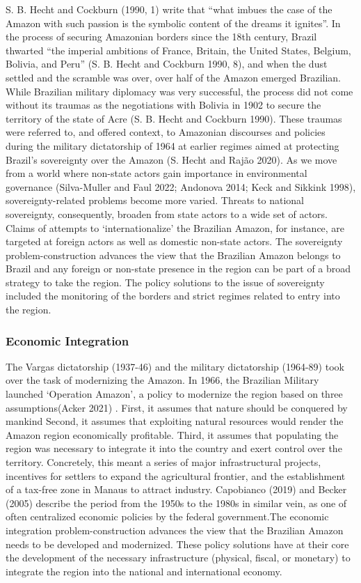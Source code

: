 \documentclass[
  12pt,
]{article}
\begin{document}
S. B. Hecht and Cockburn (1990, 1) write that ``what imbues the case of
the Amazon with such passion is the symbolic content of the dreams it
ignites''. In the process of securing Amazonian borders since the 18th
century, Brazil thwarted ``the imperial ambitions of France, Britain,
the United States, Belgium, Bolivia, and Peru'' (S. B. Hecht and
Cockburn 1990, 8), and when the dust settled and the scramble was over,
over half of the Amazon emerged Brazilian. While Brazilian military
diplomacy was very successful, the process did not come without its
traumas as the negotiations with Bolivia in 1902 to secure the territory
of the state of Acre (S. B. Hecht and Cockburn 1990). These traumas were
referred to, and offered context, to Amazonian discourses and policies
during the military dictatorship of 1964 at earlier regimes aimed at
protecting Brazil's sovereignty over the Amazon (S. Hecht and Rajão
2020). As we move from a world where non-state actors gain importance in
environmental governance (Silva-Muller and Faul 2022; Andonova 2014;
Keck and Sikkink 1998), sovereignty-related problems become more varied.
Threats to national sovereignty, consequently, broaden from state actors
to a wide set of actors. Claims of attempts to `internationalize' the
Brazilian Amazon, for instance, are targeted at foreign actors as well
as domestic non-state actors. The sovereignty problem-construction
advances the view that the Brazilian Amazon belongs to Brazil and any
foreign or non-state presence in the region can be part of a broad
strategy to take the region. The policy solutions to the issue of
sovereignty included the monitoring of the borders and strict regimes
related to entry into the region.

\hypertarget{economic-integration}{%
\subsubsection{Economic Integration}\label{economic-integration}}

The Vargas dictatorship (1937-46) and the military dictatorship
(1964-89) took over the task of modernizing the Amazon. In 1966, the
Brazilian Military launched `Operation Amazon', a policy to modernize
the region based on three assumptions(Acker 2021) . First, it assumes
that nature should be conquered by mankind Second, it assumes that
exploiting natural resources would render the Amazon region economically
profitable. Third, it assumes that populating the region was necessary
to integrate it into the country and exert control over the territory.
Concretely, this meant a series of major infrastructural projects,
incentives for settlers to expand the agricultural frontier, and the
establishment of a tax-free zone in Manaus to attract industry.
Capobianco (2019) and Becker (2005) describe the period from the 1950s
to the 1980s in similar vein, as one of often centralized economic
policies by the federal government.The economic integration
problem-construction advances the view that the Brazilian Amazon needs
to be developed and modernized. These policy solutions have at their
core the development of the necessary infrastructure (physical, fiscal,
or monetary) to integrate the region into the national and international
economy.
\end{document}
